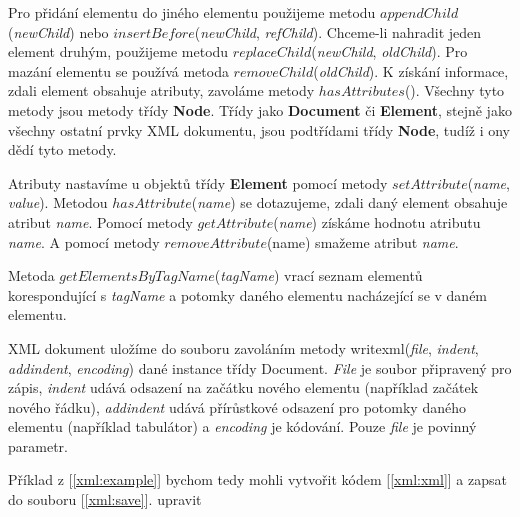 Pro přidání elementu do jiného elementu použijeme metodu
$appendChild$(\textit{newChild}) nebo
$insertBefore$(\textit{newChild}, \textit{refChild}). Chceme-li
nahradit jeden element druhým, použijeme metodu
$replaceChild$(\textit{newChild}, \textit{oldChild}). Pro mazání
elementu se používá metoda $removeChild$(\textit{oldChild}). K získání
informace, zdali element obsahuje atributy, zavoláme metody
$hasAttributes$(). Všechny tyto metody jsou metody
třídy \textbf{Node}. Třídy jako \textbf{Document} či \textbf{Element},
stejně jako všechny ostatní prvky XML dokumentu, jsou podtřídami
třídy \textbf{Node}, tudíž i ony dědí tyto metody.

Atributy nastavíme u objektů třídy \textbf{Element} pomocí metody
$setAttribute$(\textit{name}, \textit{value}). Metodou
$hasAttribute$(\textit{name}) se dotazujeme, zdali daný element
obsahuje atribut \textit{name}. Pomocí metody
$getAttribute$(\textit{name}) získáme hodnotu
atributu \textit{name}. A pomocí metody $removeAttribute$(name)
smažeme atribut \textit{name}.

Metoda $getElementsByTagName$(\textit{tagName}) vrací seznam elementů
korespondující s \textit{tagName} a potomky daného elementu
nacházející se v daném elementu.

XML dokument uložíme do souboru zavoláním metody
writexml(\textit{file}, \textit{indent}, \textit{addindent}, \textit{encoding})
dané instance třídy Document. \textit{File} je soubor připravený pro
zápis, \textit{indent} udává odsazení na začátku nového elementu
(například začátek nového řádku), \textit{addindent} udává přírůstkové
odsazení pro potomky daného elementu (například tabulátor)
a \textit{encoding} je kódování. Pouze \textit{file} je povinný
parametr.

Příklad z [\autoref{xml:example}] bychom tedy mohli vytvořit kódem
[\autoref{xml:xml}] a zapsat do souboru
[\autoref{xml:save}]. {\color{red}upravit}\\

